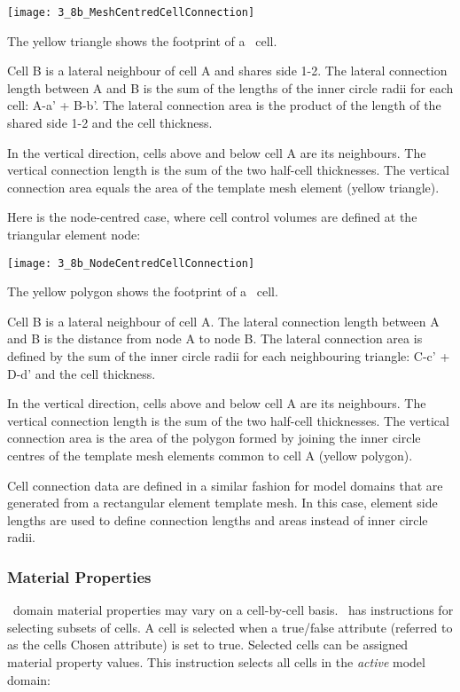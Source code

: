 {        \texttt{[image: 3\_8b\_MeshCentredCellConnection]}

The yellow triangle shows the footprint of a \mfus\ cell.

Cell B is a lateral neighbour of cell A and shares side 1-2.  The lateral connection length between A and B is the sum of the lengths of the inner circle radii for each cell: A-a' + B-b'.  The lateral connection area is the product of the length of the shared side 1-2 and the cell thickness.

In the vertical direction, cells above and below cell A are its neighbours.  The vertical connection length is the sum of the two half-cell thicknesses. The vertical connection area equals the area of the template mesh element (yellow triangle).

Here is the node-centred case, where cell control volumes are defined at the triangular element node:

        \texttt{[image: 3\_8b\_NodeCentredCellConnection]}

The yellow polygon shows the footprint of a \mfus\ cell.

Cell B is a lateral neighbour of cell A.  The lateral connection length between A and B is the distance from node A to node B. The lateral connection area is defined by the sum of the inner circle radii for each neighbouring triangle: C-c' + D-d' and the cell thickness.

In the vertical direction, cells above and below cell A are its neighbours.  The vertical connection length is the sum of the two half-cell thicknesses. The vertical connection area is the area of the polygon formed by joining the inner circle centres of the template mesh elements common to cell A (yellow polygon).

Cell connection data are defined in a similar fashion for model domains that are generated from a rectangular element template mesh.  In this case, element side lengths are used to define connection lengths and areas instead of inner circle radii.


\subsubsection{Material Properties}   \label{section:matprops}

\gwf\ domain material properties may vary on a cell-by-cell  basis.  \mut\ has instructions for selecting subsets of cells. A cell is selected when a true/false attribute (referred to as  the cells \textsf{Chosen} attribute) is set to true. Selected cells can be assigned material property values.  This instruction selects all cells in the {\em active} model domain:

}
